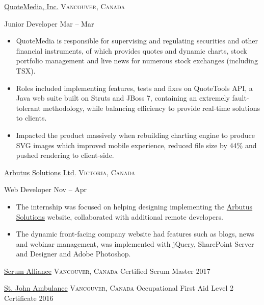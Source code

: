 \documentclass[10pt,a4paper]{article}
\begin{document}
\headedsection  %
  {\href{https://www.quotemedia.com/}{QuoteMedia, Inc.}}
  {\textsc{Vancouver, Canada}} {
  \headedsubsection
    {Junior Developer}
    {Mar  -- Mar }
    {\noindent\begin{itemize}  
\item QuoteMedia is responsible for supervising and regulating securities and other financial instruments, of which provides quotes and dynamic charts, stock portfolio management and live news for numerous stock exchanges (including TSX).
\item Roles included implementing features, tests and fixes on QuoteTools API, a Java web suite built on Struts and JBoss 7, containing an extremely
fault-tolerant methodology, while balancing efficiency to provide real-time solutions to clients.
\item Impacted the product massively when rebuilding charting engine to produce SVG images which improved mobile
experience, reduced file size by 44\% and pushed rendering to client-side.
\end{itemize}}
}

\headedsection  %
  {\href{http://arbutussolutions.com/}{Arbutus Solutions Ltd.}}
  {\textsc{Victoria, Canada}} {
  \headedsubsection
    {Web Developer}
    {Nov  -- Apr }
    {\noindent\begin{itemize}  
\item The internship was focused on helping designing implementing the \href{http://arbutussolutions.com/}{Arbutus Solutions} website, collaborated with additional remote developers.
\item The dynamic front-facing company website had features such as blogs, news and webinar management, was implemented with jQuery, SharePoint Server and Designer and Adobe Photoshop.
\end{itemize}}
}

\vspace{2em}
\spacedhrule{0em}{-0.4em}

\headedsection
  {\href{https://www.scrumalliance.org/}{Scrum Alliance}}
  {\textsc{Vancouver, Canada}} {
  \headedsubsection
    {Certified Scrum Master}
    {2017}
    {}
}

\headedsection
  {\href{https://www.sja.ca}{St. John Ambulance}}
  {\textsc{Vancouver, Canada}} {
  \headedsubsection
    {{Occupational First Aid Level 2 Certificate}}
    {2016}
    {}
}
\end{document}
